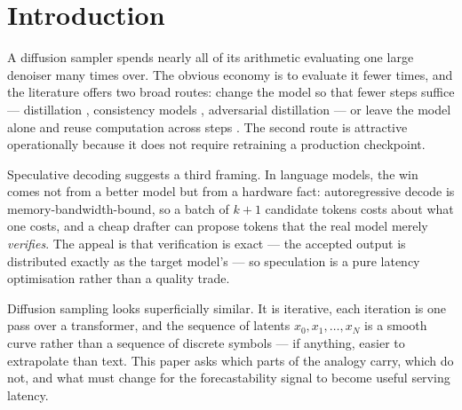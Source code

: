 \documentclass[11pt,a4paper]{article}
\begin{document}
\begin{abstract}
The paper connects these mechanisms to Align Your Steps, consistency models,
latent consistency models, flow matching, reflow, and feature-reuse methods;
shows how lane-specific anchors can provide varied batch outputs with compacted
GPU work; and reports decoded-image grids, forecast quality, predictor overhead,
and end-to-end serving measurements. The strongest production direction is to
combine aligned anchors, calibrated local momentum, pruned retrieval, fused
denoiser kernels, and memory-aware active-lane scheduling for long high-quality
samplers.
\end{abstract}

\section{Introduction}

A diffusion sampler spends nearly all of its arithmetic evaluating one large
denoiser many times over. The obvious economy is to evaluate it fewer times, and
the literature offers two broad routes: change the model so that fewer steps
suffice --- distillation \citep{salimans2022progressive}, consistency models
\citep{song2023consistency,luo2023lcm}, adversarial distillation
\citep{sauer2023adversarial} --- or leave the model alone and reuse computation
across steps \citep{ma2024deepcache,selvaraju2024fora,liu2025taylorseer}. The
second route is attractive operationally because it does not require retraining
a production checkpoint.

Speculative decoding \citep{leviathan2023speculative,chen2023accelerating}
suggests a third framing. In language models, the win comes not from a better
model but from a hardware fact: autoregressive decode is memory-bandwidth-bound,
so a batch of $k+1$ candidate tokens costs about what one costs, and a cheap
drafter can propose tokens that the real model merely \emph{verifies}. The
appeal is that verification is exact --- the accepted output is distributed
exactly as the target model's --- so speculation is a pure latency optimisation
rather than a quality trade.

Diffusion sampling looks superficially similar. It is iterative, each iteration
is one pass over a transformer, and the sequence of latents
$x_0, x_1, \dots, x_N$ is a smooth curve rather than a sequence of discrete
symbols --- if anything, easier to extrapolate than text. This paper asks
which parts of the analogy carry, which do not, and what must change for the
forecastability signal to become useful serving latency.
\end{document}
